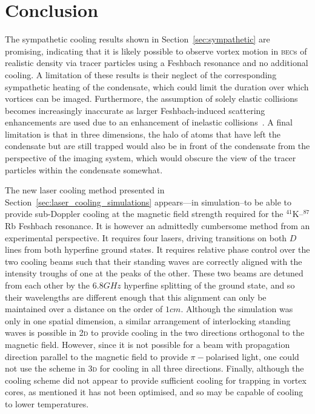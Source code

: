 \section{Conclusion}

The sympathetic cooling results shown in Section~\ref{sec:sympathetic} are promising, indicating that it is likely possible to observe vortex motion in \textsc{bec}s of realistic density via tracer particles using a Feshbach resonance and no additional cooling. A limitation of these results is their neglect of the corresponding sympathetic heating of the condensate, which could limit the duration over which vortices can be imaged. Furthermore, the assumption of solely elastic collisions becomes increasingly inaccurate as larger Feshbach-induced scattering enhancements are used due to an enhancement of inelastic collisions~\cite{stenger_strongly_1999}. A final limitation is that in three dimensions, the halo of atoms that have left the condensate but are still trapped would also be in front of the condensate from the perspective of the imaging system, which would obscure the view of the tracer particles within the condensate somewhat.

The new laser cooling method presented in Section~\ref{sec:laser_cooling_simulations} appears---in simulation--to be able to provide sub-Doppler cooling at the magnetic field strength required for the $^{41}$K--$^{87}$Rb Feshbach resonance. It is however an admittedly cumbersome method from an experimental perspective. It requires four lasers, driving transitions on both $D$ lines from both hyperfine ground states. It requires relative phase control over the two cooling beams such that their standing waves are correctly aligned with the intensity troughs of one at the peaks of the other. These two beams are detuned from each other by the $6.8\unit{GHz}$ hyperfine splitting of the ground state, and so their wavelengths are different enough that this alignment can only be maintained over a distance on the order of $1\unit{cm}$. Although the simulation was only in one spatial dimension, a similar arrangement of interlocking standing waves is possible in \textsc{2d} to provide cooling in the two directions orthogonal to the magnetic field. However, since it is not possible for a beam with propagation direction parallel to the magnetic field to provide $\pi-$polarised light, one could not use the scheme in \textsc{3d} for cooling in all three directions. Finally, although the cooling scheme did not appear to provide sufficient cooling for trapping in vortex cores, as mentioned it has not been optimised, and so may be capable of cooling to lower temperatures.